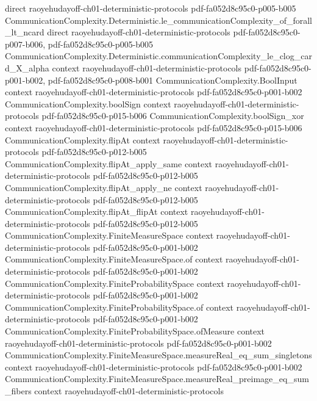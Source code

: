 \begin{theorem}
  {direct}
  {raoyehudayoff-ch01-deterministic-protocols}
  {pdf-fa052d8c95c0-p005-b005}
\proofstep
  {CommunicationComplexity.Deterministic.le_communicationComplexity_of_forall_lt_ncard}
  {direct}
  {raoyehudayoff-ch01-deterministic-protocols}
  {pdf-fa052d8c95c0-p007-b006,
    pdf-fa052d8c95c0-p005-b005}
\proofstep
  {CommunicationComplexity.Deterministic.communicationComplexity_le_clog_card_X_alpha}
  {context}
  {raoyehudayoff-ch01-deterministic-protocols}
  {pdf-fa052d8c95c0-p001-b002,
    pdf-fa052d8c95c0-p008-b001}
\proofstep
  {CommunicationComplexity.BoolInput}
  {context}
  {raoyehudayoff-ch01-deterministic-protocols}
  {pdf-fa052d8c95c0-p001-b002}
\proofstep
  {CommunicationComplexity.boolSign}
  {context}
  {raoyehudayoff-ch01-deterministic-protocols}
  {pdf-fa052d8c95c0-p015-b006}
\proofstep
  {CommunicationComplexity.boolSign_xor}
  {context}
  {raoyehudayoff-ch01-deterministic-protocols}
  {pdf-fa052d8c95c0-p015-b006}
\proofstep
  {CommunicationComplexity.flipAt}
  {context}
  {raoyehudayoff-ch01-deterministic-protocols}
  {pdf-fa052d8c95c0-p012-b005}
\proofstep
  {CommunicationComplexity.flipAt_apply_same}
  {context}
  {raoyehudayoff-ch01-deterministic-protocols}
  {pdf-fa052d8c95c0-p012-b005}
\proofstep
  {CommunicationComplexity.flipAt_apply_ne}
  {context}
  {raoyehudayoff-ch01-deterministic-protocols}
  {pdf-fa052d8c95c0-p012-b005}
\proofstep
  {CommunicationComplexity.flipAt_flipAt}
  {context}
  {raoyehudayoff-ch01-deterministic-protocols}
  {pdf-fa052d8c95c0-p012-b005}
\proofstep
  {CommunicationComplexity.FiniteMeasureSpace}
  {context}
  {raoyehudayoff-ch01-deterministic-protocols}
  {pdf-fa052d8c95c0-p001-b002}
\proofstep
  {CommunicationComplexity.FiniteMeasureSpace.of}
  {context}
  {raoyehudayoff-ch01-deterministic-protocols}
  {pdf-fa052d8c95c0-p001-b002}
\proofstep
  {CommunicationComplexity.FiniteProbabilitySpace}
  {context}
  {raoyehudayoff-ch01-deterministic-protocols}
  {pdf-fa052d8c95c0-p001-b002}
\proofstep
  {CommunicationComplexity.FiniteProbabilitySpace.of}
  {context}
  {raoyehudayoff-ch01-deterministic-protocols}
  {pdf-fa052d8c95c0-p001-b002}
\proofstep
  {CommunicationComplexity.FiniteProbabilitySpace.ofMeasure}
  {context}
  {raoyehudayoff-ch01-deterministic-protocols}
  {pdf-fa052d8c95c0-p001-b002}
\proofstep
  {CommunicationComplexity.FiniteMeasureSpace.measureReal_eq_sum_singletons}
  {context}
  {raoyehudayoff-ch01-deterministic-protocols}
  {pdf-fa052d8c95c0-p001-b002}
\proofstep
  {CommunicationComplexity.FiniteMeasureSpace.measureReal_preimage_eq_sum_fibers}
  {context}
  {raoyehudayoff-ch01-deterministic-protocols}

\end{theorem}
